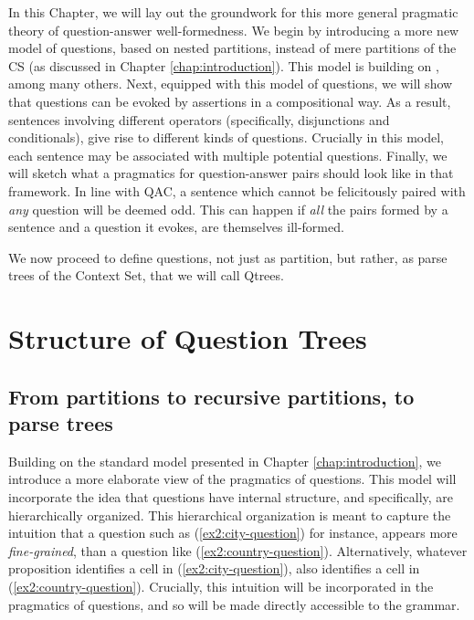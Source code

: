 In this Chapter, we will lay out the groundwork for this more general pragmatic theory of question-answer well-formedness. We begin by introducing a more new model of questions, based on nested partitions, instead of mere partitions of the CS (as discussed in Chapter \ref{chap:introduction}). This model is building on \textcite{Buring2003,Ippolito2019,Zhang2022}, among many others. Next, equipped with this model of questions, we will show that questions can be evoked by assertions in a compositional way. As a result, sentences involving different operators (specifically, disjunctions and conditionals), give rise to different kinds of questions. Crucially in this model, each sentence may be associated with multiple potential questions. Finally, we will sketch what a pragmatics for question-answer pairs should look like in that framework. In line with QAC, a sentence which cannot be felicitously paired with \textit{any} question will be deemed odd. This can happen if \textit{all} the pairs formed by a sentence and a question it evokes, are themselves ill-formed. 

We now proceed to define questions, not just as partition, but rather, as parse trees of the Context Set, that we will call Qtrees.

\section{Structure of Question Trees}

\subsection{From partitions to recursive partitions, to parse trees}\label{sec:nested-partition}
Building on the standard model presented in Chapter \ref{chap:introduction}, we introduce a more elaborate view of the pragmatics of questions. This model will incorporate the idea that questions have internal structure, and specifically, are hierarchically organized. This hierarchical organization is meant to capture the intuition that a question such as (\ref{ex2:city-question}) for instance, appears more \textit{fine-grained}, than a question like (\ref{ex2:country-question}). Alternatively, whatever proposition identifies a cell in (\ref{ex2:city-question}), also identifies a cell in (\ref{ex2:country-question}). Crucially, this intuition will be incorporated in the pragmatics of questions, and so will be made directly accessible to the grammar.

\begin{exe}
	\ex 
	\begin{xlist}
		\label{ex2:city-question}
		\label{ex2:country-question}
	\end{xlist}
\end{exe}

